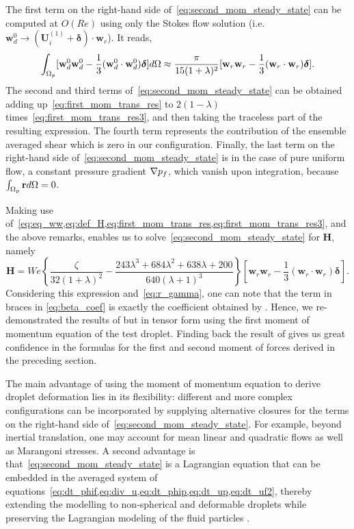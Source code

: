 The first term on the right-hand side of~\ref{eq:second_mom_steady_state} can be computed at $O(Re)$ using only the Stokes flow solution (i.e. $\textbf{w}_d^0 \to (\textbf{U}^{(1)}_i+\bm\delta)\cdot \textbf{w}_r$). It reads,
\begin{equation}
    \intO[p]{
        [\textbf{w}_d^0  \textbf{w}_d^0 
        -\frac{1}{3} (\textbf{w}_d^0 \cdot  \textbf{w}_d^0) \bm\delta]
    }
    \approx \frac{\pi}{15(1+\lambda)^2}   [
        \textbf{w}_r\textbf{w}_r-\frac{1}{3}(\textbf{w}_r\cdot\textbf{w}_r)\bm\delta
    ].
    \label{eq:eq_ww}
\end{equation}
The second and third terms of~\ref{eq:second_mom_steady_state} can be obtained adding up~\ref{eq:first_mom_trans_res} to $2(1-\lambda)$ times~\ref{eq:first_mom_trans_res3}, and then taking the traceless part of the resulting expression. 
The fourth term represents the contribution of the ensemble averaged shear which is zero in our configuration. 
Finally, the last term on the right-hand side of~\ref{eq:second_mom_steady_state} is  in the case of pure uniform flow, a constant pressure gradient $\grad p_f$, which vanish upon integration, because  $\intO[p]{\textbf{r}} =0$. 


Making use of~\ref{eq:eq_ww,eq:def_H,eq:first_mom_trans_res,eq:first_mom_trans_res3}, and the above remarks, enables us to solve~\ref{eq:second_mom_steady_state} for \textbf{H}, namely 
\begin{equation}
    \textbf{H}
    = 
    We  \left\{
        \frac{\zeta}{32(1+\lambda)^2}
        - \frac{243\lambda^3+684\lambda^2+638\lambda+200}{640(\lambda+1)^3} 
    \right\}[
        \textbf{w}_r\textbf{w}_r - \frac{1}{3}(\textbf{w}_r\cdot \textbf{w}_r)\bm\delta
    ].
    \label{eq:beta_coef}
\end{equation}
Considering this expression and~\ref{eq:r_gamma}, one can note that the term in braces in \ref{eq:beta_coef} is exactly the coefficient obtained by \citet[Eq. (21)]{taylor1964deformation}. 
Hence, we re-demonstrated the results of \citet{taylor1964deformation} but in tensor form using the first moment of momentum equation of the test droplet. 
Finding back the result of \citet{taylor1964deformation} gives us great confidence in the formulas for the first and second moment of forces derived in the preceding section.

The main advantage of using the moment of momentum equation to derive droplet deformation lies in its flexibility: different and more complex configurations can be incorporated by supplying alternative closures for the terms on the right-hand side of~\ref{eq:second_mom_steady_state}. 
For example, beyond inertial translation, one may account for mean linear and quadratic flows as well as Marangoni stresses. 
A second advantage is that~\ref{eq:second_mom_steady_state} is a Lagrangian equation that can be embedded in the averaged system of equations~\eqref{eq:dt_phif,eq:div_u,eq:dt_phip,eq:dt_up,eq:dt_uf2}, thereby extending the modelling to non-spherical and deformable droplets while preserving the Lagrangian modeling of the fluid particles \citep{fintzi2025averaged}.
